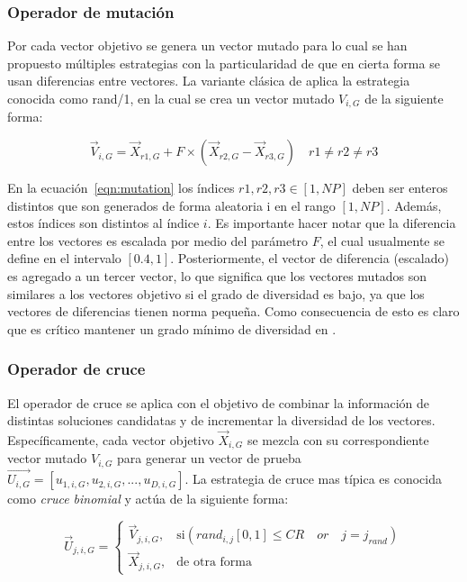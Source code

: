 \subsubsection{Operador de mutación}

Por cada vector objetivo se genera un vector mutado para lo cual se han propuesto múltiples estrategias con la particularidad de que en cierta forma
se usan diferencias entre vectores.
%
La variante clásica de \DE{} aplica la estrategia conocida como rand/1, en la cual se crea un vector mutado $V_{i,G}$ de la siguiente forma:

\begin{equation}\label{eqn:mutation}
\vec{V}_{i,G} = \vec{X}_{r1, G} + F \times (\vec{X}_{r2, G} - \vec{X}_{r3, G}) \quad r1 \neq r2 \neq r3
\end{equation}

En la ecuación~\ref{eqn:mutation} los índices $r1, r2, r3 \in [1,NP]$ deben ser enteros distintos que son generados de forma aleatoria i
en el rango $[1, NP]$.
%
Además, estos índices son distintos al índice $i$.
%
Es importante hacer notar que la diferencia entre los vectores es escalada por medio del parámetro $F$, el cual usualmente se define en el intervalo $[0.4, 1]$.
%
Posteriormente, el vector de diferencia (escalado) es agregado a un tercer vector, lo que significa que
los vectores mutados son similares a los vectores objetivo si el grado de diversidad es bajo, ya que los vectores de diferencias tienen norma pequeña.
%
Como consecuencia de esto es claro que es crítico mantener un grado mínimo de diversidad en \DE{}.

\subsubsection{Operador de cruce}

El operador de cruce se aplica con el objetivo de combinar la información de distintas soluciones candidatas y de incrementar la diversidad de los vectores.
%
Específicamente, cada vector objetivo $\vec{X}_{i,G}$ se mezcla con su correspondiente vector mutado $V_{i,G}$ para generar un vector de 
prueba $\vec{U_{i,G}} = [u_{1,i,G},u_{2,i,G}, ..., u_{D,i,G} ]$.
%
La estrategia de cruce mas típica es conocida como \textit{cruce binomial} y actúa de la siguiente forma:

\begin{equation} \label{eqn:crossover}
\vec{U}_{j,i,G}= 
\begin{cases}
    \vec{V}_{j,i,G},& \text{si} (rand_{i,j}[0,1] \leq CR \quad or \quad j = j_{rand}  )\\
    \vec{X}_{j,i,G},              & \text{de otra forma}
\end{cases}
\end{equation}

